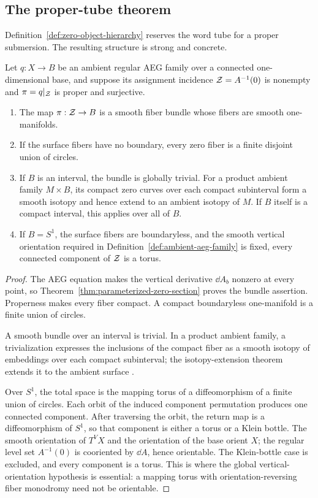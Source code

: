 \subsection{The proper-tube theorem}

Definition~\ref{def:zero-object-hierarchy} reserves the word tube for a proper
submersion.  The resulting structure is strong and concrete.

\begin{theorem}
\label{thm:proper-real-zero-tube}
Let $q:X\to B$ be an ambient regular AEG family over a connected one-dimensional
base, and suppose its assignment incidence $\mathcal Z=A^{-1}(0)$ is nonempty and
$\pi=q|_{\mathcal Z}$ is proper and surjective.
\begin{enumerate}
\item The map $\pi:\mathcal Z\to B$ is a smooth fiber bundle whose fibers are smooth
one-manifolds.
\item If the surface fibers have no boundary, every zero fiber is a finite disjoint
union of circles.
\item If $B$ is an interval, the bundle is globally trivial.  For a product
ambient family $M\times B$, its compact zero curves over each compact subinterval
form a smooth isotopy and hence extend to an ambient isotopy of $M$.  If $B$ itself
is a compact interval, this applies over all of $B$.
\item If $B=S^1$, the surface fibers are boundaryless, and the smooth vertical
orientation required in Definition~\ref{def:ambient-aeg-family} is fixed, every
connected component of $\mathcal Z$ is a torus.
\end{enumerate}
\end{theorem}

\begin{proof}
The AEG equation makes the vertical derivative $\dd A_b$ nonzero at every point,
so Theorem~\ref{thm:parameterized-zero-section} proves the bundle assertion.
Properness makes every fiber compact.  A compact boundaryless one-manifold is a
finite union of circles.

A smooth bundle over an interval is trivial.  In a product ambient family, a
trivialization expresses the inclusions of the compact fiber as a smooth isotopy of
embeddings over each compact subinterval; the isotopy-extension theorem extends it
to the ambient surface
\cite{Hirsch1976DifferentialTopology}.

Over $S^1$, the total space is the mapping torus of a diffeomorphism of a finite
union of circles.  Each orbit of the induced component permutation produces one
connected component.  After traversing the orbit, the return map is a
diffeomorphism of $S^1$, so that component is either a torus or a Klein bottle.
The smooth orientation of $T^VX$ and the orientation of the base orient $X$; the
regular level set $A^{-1}(0)$ is cooriented by $\dd A$, hence orientable.  The
Klein-bottle case is excluded, and every component is a torus.  This is where the
global vertical-orientation hypothesis is essential: a mapping torus with
orientation-reversing fiber monodromy need not be orientable.
\end{proof}

